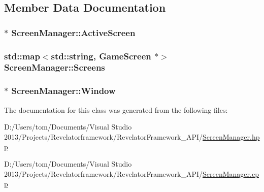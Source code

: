 \subsection{Member Data Documentation}
\hypertarget{class_screen_manager_abb46941be1b908a2b9d8053409e89597}{
\subsubsection[{Active\-Screen}]{$\ast$ Screen\-Manager\-::\-Active\-Screen\hspace{0.3cm}{\ttfamily [private]}}}\label{class_screen_manager_abb46941be1b908a2b9d8053409e89597}
\hypertarget{class_screen_manager_a54eb2c9667efda525a35d0d7043e8807}{
\subsubsection[{Screens}]{\setlength{\rightskip}{0pt plus 5cm}std\-::map$<$std\-::string, {\bf Game\-Screen} $\ast$$>$ Screen\-Manager\-::\-Screens\hspace{0.3cm}{\ttfamily [private]}}}\label{class_screen_manager_a54eb2c9667efda525a35d0d7043e8807}
\hypertarget{class_screen_manager_a5fee528eafa1b2defad2a7c4bd6766aa}{
\subsubsection[{Window}]{$\ast$ Screen\-Manager\-::\-Window\hspace{0.3cm}{\ttfamily [private]}}}\label{class_screen_manager_a5fee528eafa1b2defad2a7c4bd6766aa}


The documentation for this class was generated from the following files\-:\begin{DoxyCompactItemize}
\item 
D\-:/\-Users/tom/\-Documents/\-Visual Studio 2013/\-Projects/\-Revelatorframework/\-Revelator\-Framework\-\_\-\-A\-P\-I/\hyperlink{_screen_manager_8hpp}{Screen\-Manager.\-hpp}\item 
D\-:/\-Users/tom/\-Documents/\-Visual Studio 2013/\-Projects/\-Revelatorframework/\-Revelator\-Framework\-\_\-\-A\-P\-I/\hyperlink{_screen_manager_8cpp}{Screen\-Manager.\-cpp}\end{DoxyCompactItemize}

